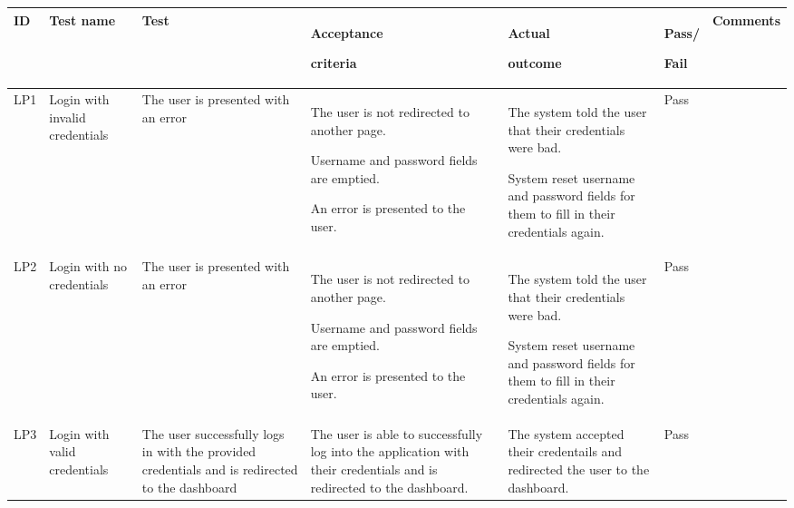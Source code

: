  \begin{longtable}{|p{}|p{}|p{}|p{}|p{}|p{}|p{}|}
  \hline
  ID  &   Test name                    & Test                                                                                           & Acceptance \par criteria                                                                                                           & Actual \par outcome                                                                                                                                        & Pass/\par Fail & Comments\\
  \hline\hline                                                                                                                             
  LP1 & Login with invalid credentials & The user is presented with an error                                                            & The user is not redirected to another page. \par Username and password fields are emptied. \par An error is presented to the user. & The system told the user that their credentials were bad. \par System reset username and password fields for them to fill in their credentials again.      & Pass           &         \\
  \hline                                                                                                                                   
  LP2 & Login with no credentials      & The user is presented with an error                                                            & The user is not redirected to another page. \par Username and password fields are emptied. \par An error is presented to the user. & The system told the user that their credentials were bad. \par System reset username and password fields for them to fill in their credentials again.      & Pass           &         \\
  \hline
  LP3 & Login with valid credentials   & The user successfully logs in with the provided credentials and is redirected to the dashboard & The user is able to successfully log into the application with their credentials and is redirected to the dashboard.               & The system accepted their credentails and redirected the user to the dashboard.                                                                            & Pass           &         \\

\end{longtable}
